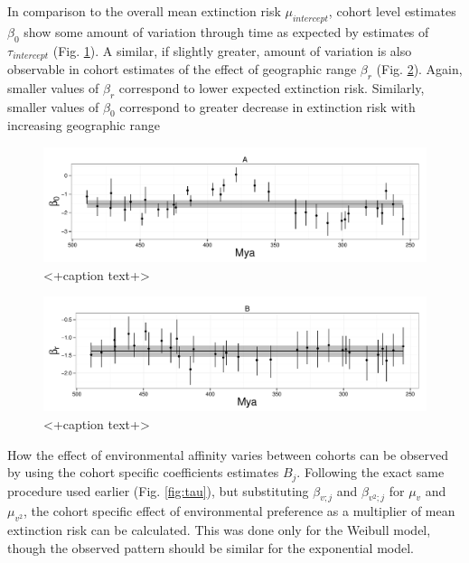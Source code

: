 \documentclass[12pt,letterpaper]{article}
\begin{document}
In comparison to the overall mean extinction risk \(\mu_{intercept}\), cohort level estimates \(\beta_{0}\) show some amount of variation through time as expected by estimates of \(\tau_{intercept}\) (Fig. \ref{fig:cohort_intercept}). A similar, if slightly greater, amount of variation is also observable in cohort estimates of the effect of geographic range \(\beta_{r}\) (Fig. \ref{fig:cohort_range}). Again, smaller values of \(\beta_{r}\) correspond to lower expected extinction risk. Similarly, smaller values of \(\beta_{0}\) correspond to greater decrease in extinction risk with increasing geographic range 
\begin{figure}[ht]
  \centering
  \includegraphics[height = 0.5\textheight,width=\textwidth,keepaspectratio=true]{figure/intercept_cohort}
  \caption{<+caption text+>}
  \label{fig:cohort_intercept}
\end{figure}

\begin{figure}[ht]
  \centering
  \includegraphics[height = 0.5\textheight,width=\textwidth,keepaspectratio=true]{figure/range_cohort}
  \caption{<+caption text+>}
  \label{fig:cohort_range}
\end{figure}

How the effect of environmental affinity varies between cohorts can be observed by using the cohort specific coefficients estimates \(B_{j}\). Following the exact same procedure used earlier (Fig. \ref{fig:tau}), but substituting \(\beta_{v; j}\) and \(\beta_{v^{2}; j}\) for \(\mu_{v}\) and \(\mu_{v^{2}}\), the cohort specific effect of environmental preference as a multiplier of mean extinction risk can be calculated. This was done only for the Weibull model, though the observed pattern should be similar for the exponential model. 
\end{document}
